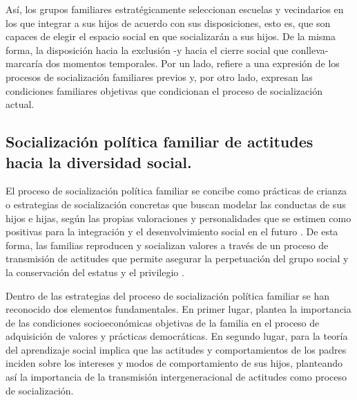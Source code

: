 \documentclass[12pt,twoside]{templates/facsothesis}
\begin{document}
Así, los grupos familiares estratégicamente seleccionan escuelas y vecindarios en los que integrar a sus hijos de acuerdo con sus disposiciones, esto es, que son capaces de elegir el espacio social en que socializarán a sus hijos. De la misma forma, la disposición hacia la exclusión -y hacia el cierre social que conlleva- marcaría dos momentos temporales. Por un lado, refiere a una expresión de los procesos de socialización familiares previos y, por otro lado, expresan las condiciones familiares objetivas que condicionan el proceso de socialización actual.

\hypertarget{socializaciuxf3n-poluxedtica-familiar-de-actitudes-hacia-la-diversidad-social.}{%
\subsection{Socialización política familiar de actitudes hacia la diversidad social.}\label{socializaciuxf3n-poluxedtica-familiar-de-actitudes-hacia-la-diversidad-social.}}

El proceso de socialización política familiar se concibe como prácticas de crianza o estrategias de socialización concretas que buscan modelar las conductas de sus hijos e hijas, según las propias valoraciones y personalidades que se estimen como positivas para la integración y el desenvolvimiento social en el futuro \citep{ramirez_padres_2005}. De esta forma, las familias reproducen y socializan valores a través de un proceso de transmisión de actitudes que permite asegurar la perpetuación del grupo social y la conservación del estatus y el privilegio \citep{bourdieu_reproduccion_1998, bernstein_theoretical_2005}.

Dentro de las estrategias del proceso de socialización política familiar se han reconocido dos elementos fundamentales. En primer lugar, \citet{lipset_hombre_1997} plantea la importancia de las condiciones socioeconómicas objetivas de la familia en el proceso de adquisición de valores y prácticas democráticas. En segundo lugar, para \citet{bandura_sociallearning_1969} la teoría del aprendizaje social implica que las actitudes y comportamientos de los padres inciden sobre los intereses y modos de comportamiento de sus hijos, planteando así la importancia de la transmisión intergeneracional de actitudes como proceso de socialización.
\end{document}
